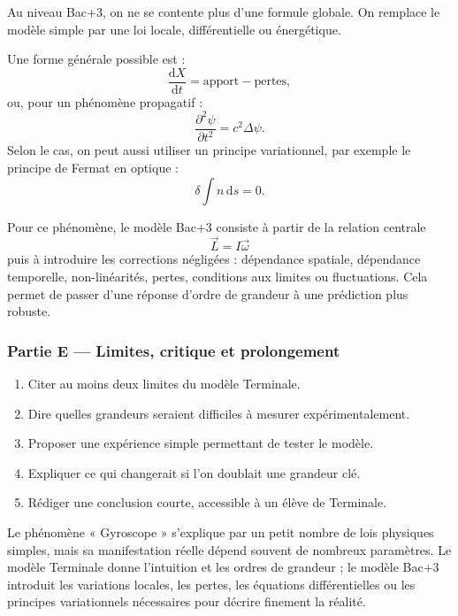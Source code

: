 \documentclass[11pt,a4paper]{article}
\begin{document}
\begin{approfondissementbox}
Au niveau Bac+3, on ne se contente plus d'une formule globale. On remplace le modèle simple par une loi locale, différentielle ou énergétique.

Une forme générale possible est :
\[
\frac{\mathrm d X}{\mathrm dt}=\text{apport}-\text{pertes},
\]
ou, pour un phénomène propagatif :
\[
\frac{\partial^2 \psi}{\partial t^2}=c^2\Delta\psi.
\]
Selon le cas, on peut aussi utiliser un principe variationnel, par exemple le principe de Fermat en optique :
\[
\delta \int n\,\mathrm ds=0.
\]

Pour ce phénomène, le modèle Bac+3 consiste à partir de la relation centrale
\[
\vec L=I\vec\omega
\]
puis à introduire les corrections négligées : dépendance spatiale, dépendance temporelle, non-linéarités, pertes, conditions aux limites ou fluctuations. Cela permet de passer d'une réponse d'ordre de grandeur à une prédiction plus robuste.
\end{approfondissementbox}

\subsubsection*{Partie E — Limites, critique et prolongement}

\begin{enumerate}
  \item Citer au moins deux limites du modèle Terminale.
  \item Dire quelles grandeurs seraient difficiles à mesurer expérimentalement.
  \item Proposer une expérience simple permettant de tester le modèle.
  \item Expliquer ce qui changerait si l'on doublait une grandeur clé.
  \item Rédiger une conclusion courte, accessible à un élève de Terminale.
\end{enumerate}

\begin{corrigebox}
Le phénomène « Gyroscope » s'explique par un petit nombre de lois physiques simples, mais sa manifestation réelle dépend souvent de nombreux paramètres. Le modèle Terminale donne l'intuition et les ordres de grandeur ; le modèle Bac+3 introduit les variations locales, les pertes, les équations différentielles ou les principes variationnels nécessaires pour décrire finement la réalité.
\end{corrigebox}
\end{document}
